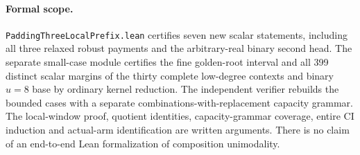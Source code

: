 \paragraph{Formal scope.}
\texttt{PaddingThreeLocalPrefix.lean} certifies seven new scalar
statements, including all three relaxed robust payments and the
arbitrary-real binary second head. The separate small-case module
certifies the fine golden-root interval and all 399 distinct scalar
margins of the thirty complete low-degree contexts and binary $u=8$
base by ordinary kernel reduction. The independent verifier rebuilds
the bounded cases with a separate combinations-with-replacement
capacity grammar. The local-window proof, quotient identities,
capacity-grammar coverage, entire CI induction and actual-arm
identification are written arguments. There is no claim of an
end-to-end Lean formalization of composition unimodality.
